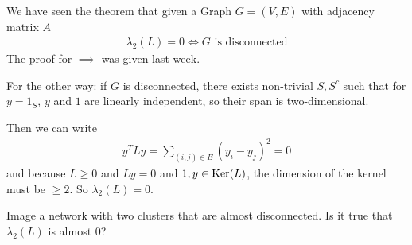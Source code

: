We have seen the theorem that given a Graph $G=(V,E)$ with adjacency matrix $A$
\begin{align*}
  \lambda_2(L) = 0 \iff G \text{ is disconnected}
\end{align*}
The proof for $\implies$ was given last week.

For the other way: if $G$ is disconnected, there exists non-trivial $S,S^{c}$ such that for $y = 1_S$, $y$ and $1$ are linearly independent, so their span is two-dimensional.

Then we can write
\begin{align*}
  y^{T}Ly = \sum_{(i,j) \in E}(y_i - y_j)^{2} = 0
\end{align*}
and because $L \geq 0$ and $Ly = 0$ and $1,y \in \operatorname{Ker}(L)$, the dimension of the kernel must be $\geq 2$. So $\lambda_2(L) = 0$.


Image a network with two clusters that are almost disconnected. Is it true that $\lambda_2(L)$ is almost $0$?


